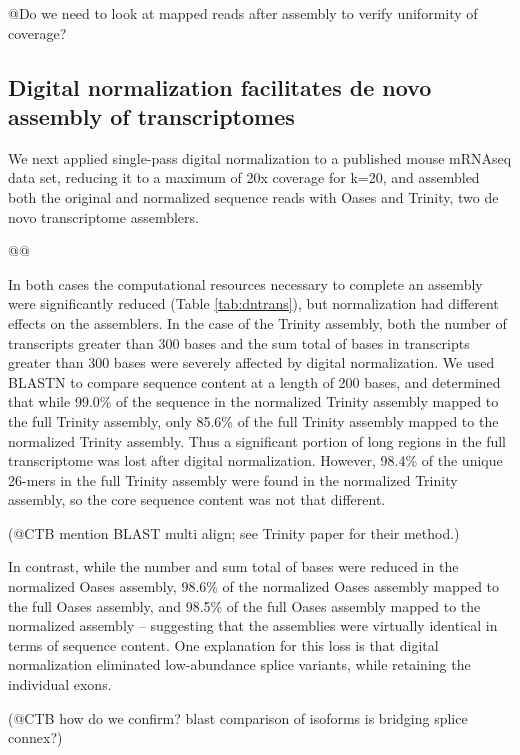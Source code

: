 \documentclass[10pt]{article}
\begin{document}
@Do we need to look at mapped reads after assembly to verify uniformity
of coverage?

\subsection*{Digital normalization facilitates de novo assembly of transcriptomes}

We next applied single-pass digital normalization to a published mouse
mRNAseq data set, reducing it to a maximum of 20x coverage for k=20,
and assembled both the original and normalized sequence reads with
Oases and Trinity, two de novo transcriptome assemblers.

@@

In both cases the computational resources necessary to complete an
assembly were significantly reduced (Table \ref{tab:dntrans}), but
normalization had different effects on the assemblers.  In the case of
the Trinity assembly, both the number of transcripts greater than 300
bases and the sum total of bases in transcripts greater than 300 bases
were severely affected by digital normalization.  We used BLASTN to
compare sequence content at a length of 200 bases, and determined that
while 99.0\% of the sequence in the normalized Trinity assembly mapped
to the full Trinity assembly, only 85.6\% of the full Trinity assembly
mapped to the normalized Trinity assembly.  Thus a significant portion
of long regions in the full transcriptome was lost after digital
normalization.  However, 98.4\% of the unique 26-mers in the full
Trinity assembly were found in the normalized Trinity assembly, so the
core sequence content was not that different.

(@CTB mention BLAST multi align; see Trinity
paper for their method.)

In contrast, while the number and sum total of bases were reduced in
the normalized Oases assembly, 98.6\% of the normalized Oases
assembly mapped to the full Oases assembly, and 98.5\% of the full
Oases assembly mapped to the normalized assembly -- suggesting that
the assemblies were virtually identical in terms of sequence content.
One explanation for this loss is that digital normalization
eliminated low-abundance splice variants, while retaining the
individual exons.

(@CTB how do we confirm?  blast comparison of isoforms is bridging splice connex?)
\end{document}
